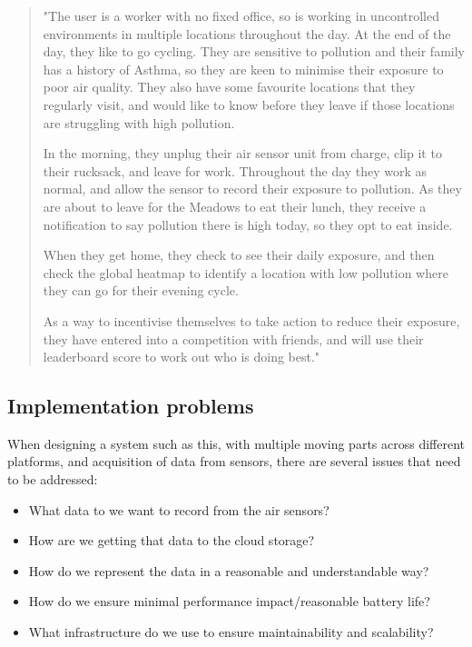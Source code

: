 \documentclass[sigconf, nonacm]{acmart}
\begin{document}
\begin{quotation}
	"The user is a worker with no fixed office, so is working in uncontrolled environments
	in multiple locations throughout the day. At the end of the day, they like to go 
	cycling. They are sensitive to pollution and their family has a history of Asthma, so
	they are keen to minimise their exposure to poor air quality. They also have some 
	favourite locations that they regularly visit, and would like to know before they leave
	if those locations are struggling with high pollution.
	
	In the morning, they unplug their air sensor unit from charge, clip it to their rucksack,
	and leave for work. Throughout the day they work as normal, and allow the sensor to 
	record their exposure to pollution. As they are about to leave for the Meadows to eat
	their lunch, they receive a notification to say pollution there is high today, so they
	opt to eat inside.
	
	When they get home, they check to see their daily exposure, and then check the global
	heatmap to identify a location with low pollution where they can go for their evening
	cycle.
	
	As a way to incentivise themselves to take action to reduce their exposure, they have
	entered into a competition with friends, and will use their leaderboard score to work
	out who is doing best."
\end{quotation}

\subsection{Implementation problems}

When designing a system such as this, with multiple moving parts across different platforms,
and acquisition of data from sensors, there are several issues that need to be addressed:

\begin{itemize}
	\item What data to we want to record from the air sensors?
	\item How are we getting that data to the cloud storage?
	\item How do we represent the data in a reasonable and understandable way?
	\item How do we ensure minimal performance impact/reasonable battery life?
	\item What infrastructure do we use to ensure maintainability and scalability?
\end{itemize}
\end{document}
